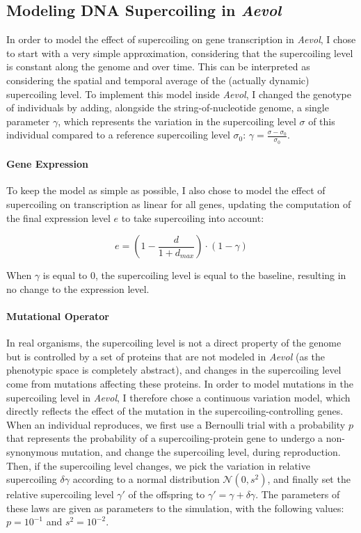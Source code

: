 \subsection{Modeling DNA Supercoiling in \emph{Aevol}}

In order to model the effect of supercoiling on gene transcription in \emph{Aevol}, I chose to start with a very simple approximation, considering that the supercoiling level is constant along the genome and over time.
This can be interpreted as considering the spatial and temporal average of the (actually dynamic) supercoiling level.
To implement this model inside \emph{Aevol}, I changed the genotype of individuals by adding, alongside the string-of-nucleotide genome, a single parameter $\gamma$, which represents the variation in the supercoiling level $\sigma$ of this individual compared to a reference supercoiling level $\sigma_0$: $\gamma = \frac{\sigma-\sigma_0}{\sigma_0}$.

\paragraph{Gene Expression}
To keep the model as simple as possible, I also chose to model the effect of supercoiling on transcription as linear for all genes, updating the computation of the final expression level $e$ to take supercoiling into account:

\begin{equation}
e = (1 - \frac{d}{1+d_{max}}) \cdot (1 - \gamma)
\label{eq:aevol_sc}
\end{equation}

When $\gamma$ is equal to 0, the supercoiling level is equal to the baseline, resulting in no change to the expression level.

\paragraph{Mutational Operator}
In real organisms, the supercoiling level is not a direct property of the genome but is controlled by a set of proteins that are not modeled in \emph{Aevol} (as the phenotypic space is completely abstract), and changes in the supercoiling level come from mutations affecting these proteins.
In order to model mutations in the supercoiling level in \emph{Aevol}, I therefore chose a continuous variation model, which directly reflects the effect of the mutation in the supercoiling-controlling genes.
When an individual reproduces, we first use a Bernoulli trial with a probability $p$ that represents the probability of a supercoiling-protein gene to undergo a non-synonymous mutation, and change the supercoiling level, during reproduction.
Then, if the supercoiling level changes, we pick the variation in relative supercoiling $\delta\gamma$ according to a normal distribution $\mathcal{N}(0, s^2)$, and finally set the relative supercoiling level $\gamma'$ of the offspring to $\gamma' = \gamma + \delta\gamma$.
The parameters of these laws are given as parameters to the simulation, with the following values: $p = 10^{-1}$ and $s^2 = 10^{-2}$.


